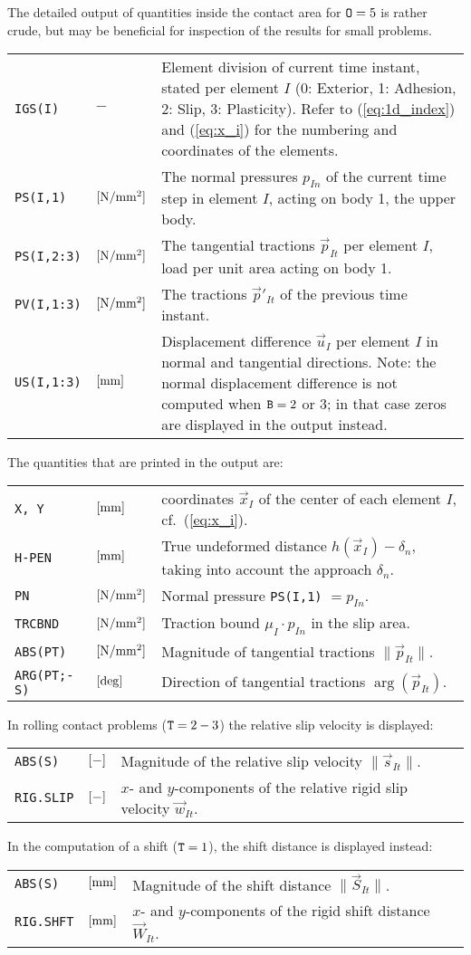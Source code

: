 \documentclass[12pt]{report}
\newenvironment{inputvars}{\vspace{0.4\baselineskip}%

\begin{tabular}{>{\raggedright}p{22mm}p{19mm}p{113mm}}}{
\end{tabular}

}
\newcommand{\inpvar}[3]{{\small\tt #1} & $#2$ & #3 \\[1ex]}
\newcommand{\inpvarw}[3]{\mbox{{\small\tt #1}\hspace{-5mm}} & $#2$ & #3 \\[1ex]}
\begin{document}
The detailed output of quantities inside the contact area for ${\tt O}=5$
is rather crude, but may be beneficial for inspection of the results for
small problems.
\begin{inputvars}
\inpvar{IGS(I)}{-}{Element division of current time instant, stated per
                   element $I$ (0: Exterior, 1: Adhesion, 2: Slip, 3:
                   Plasticity). Refer to (\ref{eq:1d_index}) and
                   (\ref{eq:x_i}) for the numbering and coordinates of the elements.}
\inpvar{PS(I,1)}{\bunit{N/mm^2}}{The normal pressures $p_{In}$ of the current time
        step in element $I$, acting on body 1, the upper body.}
\inpvar{PS(I,2:3)}{\bunit{N/mm^2}}{The tangential tractions $\vec{p}_{It}$ per
        element $I$, load per unit area acting on body 1.}
\inpvar{PV(I,1:3)}{\bunit{N/mm^2}}{The tractions $\vec{p}'_{It}$ of the previous
        time instant.}
\inpvar{US(I,1:3)}{\bunit{mm}}{Displacement difference $\vec{u}_I$ per element
        $I$ in normal and tangential directions. Note: the normal
        displacement difference is not computed when ${\tt B}=2$ or 3; in
        that case zeros are displayed in the output instead.}
\end{inputvars}
The quantities that are printed in the output are:
\begin{inputvars}
\inpvar{X, Y}{\bunit{mm}}{coordinates $\vec{x}_I$ of the center of each element $I$,
        cf.\ (\ref{eq:x_i}).}
\inpvar{H-PEN}{\bunit{mm}}{True undeformed distance $h(\vec{x}_I)-\delta_n$, taking
        into account the approach $\delta_n$.}
\inpvar{PN}{\bunit{N/mm^2}}{Normal pressure {\tt PS(I,1)} $=p_{In}$.}
\inpvarw{TRCBND}{\bunit{N/mm^2}}{Traction bound $\mu_I\cdot p_{In}$ in the slip
        area.}
\inpvar{ABS(PT)}{\bunit{N/mm^2}}{Magnitude of tangential tractions
        $\| \vec{p}_{It} \|$.}
\inpvar{ARG(PT;-S)}{\bunit{deg}}{Direction of tangential tractions
        $\arg(\vec{p}_{It})$.}
\end{inputvars}
In rolling contact problems (${\tt T}=2-3$) the relative slip velocity is
displayed:
\begin{inputvars}
\inpvar{ABS(S)}{\bunit{-}}{Magnitude of the relative slip velocity
        $\|\vec{s}_{It} \|$.}
\inpvar{RIG.SLIP}{\bunit{-}}{$x$- and $y$-components of the relative rigid slip
        velocity $\vec{w}_{It}$.}
\end{inputvars}
In the computation of a shift (${\tt T}=1$), the shift distance is
displayed instead:
\begin{inputvars}
\inpvar{ABS(S)}{\bunit{mm}}{Magnitude of the shift distance $\| \vec{S}_{It} \|$.}
\inpvar{RIG.SHFT}{\bunit{mm}}{$x$- and $y$-components of the rigid shift distance
        $\vec{W}_{It}$.}
\end{inputvars}
\end{document}

